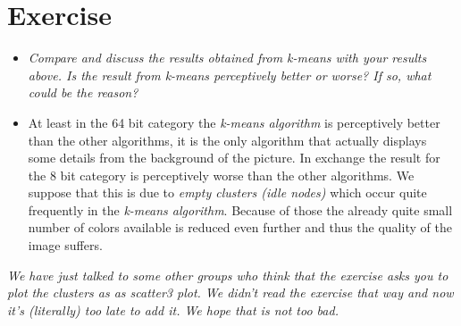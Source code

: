 \documentclass[a4paper]{image-gallery}
\begin{document}
    \section{Exercise}
  \begin{itemize}
  	\item \textit{Compare and discuss the results obtained from k-means with your results above. Is the
result from k-means perceptively better or worse? If so, what could be the reason?}
	\item At least in the 64 bit category the \textit{k-means algorithm} is perceptively better than the other algorithms, it is the only algorithm that actually displays some details from the background of the picture. In exchange the result for the 8 bit category is perceptively worse than the other algorithms. We suppose that this is due to \textit{empty clusters (idle nodes)} which occur quite frequently in the \textit{k-means algorithm}. Because of those the already quite small number of colors available is reduced even further and thus the quality of the image suffers.
  \end{itemize}
  
\textit{We have just talked to some other groups who think that the exercise asks you to plot the clusters as as scatter3 plot. We didn't read the exercise that way and now it's (literally) too late to add it. We hope that is not too bad.}
\end{document}
